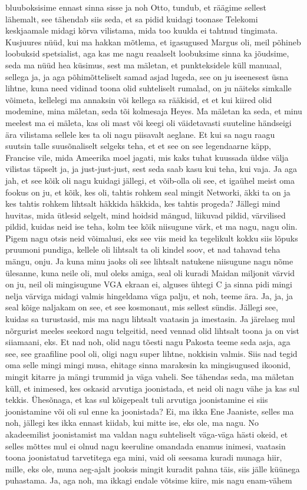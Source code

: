 bluuboksisime ennast sinna sisse ja noh Otto, tundub, et räägime sellest lähemalt, see tähendab siis seda, et sa pidid kuidagi toonase Telekomi keskjaamale midagi kõrva vilistama, mida too kuulda ei tahtnud tingimata. Kusjuures nüüd, kui ma hakkan mõtlema, et igasugused Margus oli, meil põhineb loobuksid spetsialist, aga kas me nagu reaalselt loobuksime sinna ka jõudsime, seda ma nüüd hea küsimus, sest ma mäletan, et punkteksidele küll manuaal, sellega ja, ja aga põhimõtteliselt samad asjad lugeda, see on ju iseenesest üsna lihtne, kuna need vidinad toona olid suhteliselt rumalad, on ju näiteks simkalle võimeta, kellelegi ma annaksin või kellega sa rääkisid, et et kui kiired olid modemine, mina mäletan, seda tõi kolmesaja Heyes. Ma mäletan ka seda, et minu meelest ma ei mäleta, kas oli mast või keegi oli väidetavasti suuteline händseigi ära vilistama sellele kes ta oli nagu piisavalt aeglane. Et kui sa nagu raagu suutsin talle suusõnaliselt selgeks teha, et et see on see legendaarne käpp, Francise vile, mida Ameerika moel jagati, mis kaks tuhat kuussada üldse välja vilistas täpselt ja, ja just-just-just, sest seda saab kasu kui teha, kui vaja. Ja aga jah, et see kõik oli nagu kuidagi jällegi, et võib-olla oli see, et igaühel meist oma fookus on ju, et kõik, kes oli, tahtis rohkem seal mingit Networki, äkki ta on ja kes tahtis rohkem lihtsalt häkkida häkkida, kes tahtis progeda? Jällegi mind huvitas, mida ütlesid selgelt, mind hoidsid mängud, liikuvad pildid, värvilised pildid, kuidas neid ise teha, kolm tee kõik niisugune värk, et ma nagu, nagu olin. Pigem nagu otsis neid võimalusi, eks see viis meid ka tegelikult kokku siis lõpuks pruumoni pundiga, kellele oli lihtsalt ta oli kindel soov, et nad tahavad teha mängu, onju. Ja kuna minu jaoks oli see lihtsalt natukene niisugune nagu nõme ülesanne, kuna neile oli, mul oleks amiga, seal oli kuradi Maidan miljonit värvid on ju, neil oli mingisugune VGA ekraan ei, alguses ühtegi C ja sinna pidi mingi nelja värviga midagi valmis hingeldama väga palju, et noh, teeme ära. Ja, ja, ja seal kõige naljakam on see, et see kosmonaut, mis sellest sündis. Jällegi see, kuidas sa turustasid, mis ma nagu lihtsalt vaatasin ja imestasin. Ja järelaeg mul nõrgurist meeles seekord nagu telgeitid, need vennad olid lihtsalt toona ja on vist siiamaani, eks. Et nad noh, olid nagu tõesti nagu Pakosta teeme seda asja, aga see, see graafiline pool oli, oligi nagu super lihtne, nokkisin valmis. Siis nad tegid oma selle mingi mingi musa, ehitage sinna marakesin ka mingisugused ikoonid, mingit kitarre ja mängi trummid ja väga vaheli. See tähendas seda, ma mäletan küll, et inimesed, kes oskasid arvutiga joonistada, et neid oli nagu vähe ja kas sul tekkis. Ühesõnaga, et kas sul kõigepealt tuli arvutiga joonistamine ei siis joonistamine või oli sul enne ka joonistada? Ei, ma ikka Ene Jaaniste, selles ma noh, jällegi kes ikka ennast kiidab, kui mitte ise, eks ole, ma nagu. No akadeemilist joonistamist ma valdan nagu suhteliselt väga-väga hästi okeid, et selles mõttes mul ei olnud nagu keeruline omandada enamus inimesi, vaatasin toona joonistatud tarvetitega ega mini, vaid oli seesama kuradi munaga hiir, mille, eks ole, muna aeg-ajalt jooksis mingit kuradit pahna täis, siis jälle küünega puhastama. Ja, aga noh, ma ikkagi endale võtsime kiire, mis nagu enam-vähem 
